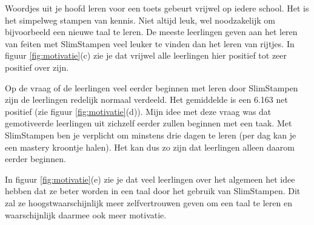 \documentclass[12pt, a4paper]{article}
\begin{document}
Woordjes uit je hoofd leren voor een toets gebeurt vrijwel op iedere school. Het is het simpelweg stampen van kennis. Niet altijd leuk, wel noodzakelijk om bijvoorbeeld een nieuwe taal te leren. De meeste leerlingen geven aan het leren van feiten met SlimStampen veel leuker te vinden dan het leren van rijtjes. In figuur \ref*{fig:motivatie}(c) zie je dat vrijwel alle leerlingen hier positief tot zeer positief over zijn.

Op de vraag of de leerlingen veel eerder beginnen met leren door SlimStampen zijn de leerlingen redelijk normaal verdeeld. Het gemiddelde is een 6.163 net positief (zie figuur \ref*{fig:motivatie}(d)). Mijn idee met deze vraag was dat gemotiveerde leerlingen uit zichzelf eerder zullen beginnen met een taak. Met SlimStampen ben je verplicht om minstens drie dagen te leren (per dag kan je een mastery kroontje halen). Het kan dus zo zijn dat leerlingen alleen daarom eerder beginnen.

In figuur \ref*{fig:motivatie}(e) zie je dat veel leerlingen over het algemeen het idee hebben dat ze beter worden in een taal door het gebruik van SlimStampen. Dit zal ze hoogstwaarschijnlijk meer zelfvertrouwen geven om een taal te leren en waarschijnlijk daarmee ook meer motivatie.
\end{document}
